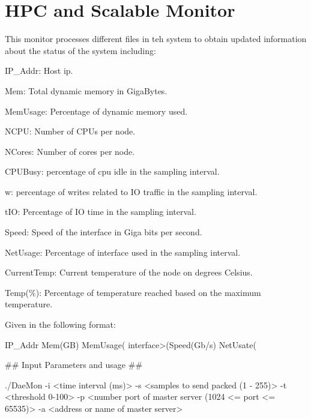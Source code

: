 \section*{H\+PC and Scalable Monitor}

This monitor processes different files in teh system to obtain updated information about the status of the system including\+:


\begin{DoxyItemize}
\item I\+P\+\_\+\+Addr\+: Host ip.
\item Mem\+: Total dynamic memory in Giga\+Bytes.
\item Mem\+Usage\+: Percentage of dynamic memory used.
\item N\+C\+PU\+: Number of C\+P\+Us per node.
\item N\+Cores\+: Number of cores per node.
\item C\+P\+U\+Busy\+: percentage of cpu idle in the sampling interval.
\item w\+: percentage of writes related to IO traffic in the sampling interval.
\item t\+IO\+: Percentage of IO time in the sampling interval.
\item Speed\+: Speed of the interface in Giga bits per second.
\item Net\+Usage\+: Percentage of interface used in the sampling interval.
\item Current\+Temp\+: Current temperature of the node on degrees Celsius.
\item Temp(\%)\+: Percentage of temperature reached based on the maximum temperature.
\end{DoxyItemize}

Given in the following format\+:


\begin{DoxyCode}
IP\_Addr Mem(GB) MemUsage(%
       interface>(Speed(Gb/s) NetUsate(%
\end{DoxyCode}


\#\# Input Parameters and usage \#\# 
\begin{DoxyCode}
./DaeMon -i <time interval (ms)> -s <samples to send packed (1 - 255)> -t <threshold 0-100> -p <number port
       of master server (1024 <= port <= 65535)> -a <address or name of master server> 
\end{DoxyCode}



